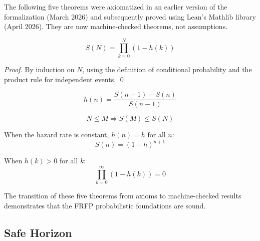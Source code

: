 The following five theorems were axiomatized in an earlier version of the
formalization (March 2026) and subsequently proved using Lean's Mathlib library
(April 2026). They are now machine-checked theorems, not assumptions.

\begin{theorem}
\[
  S(N) = \prod_{k=0}^{N} (1 - h(k))
\]
\end{theorem}
\begin{proof}
By induction on $N$, using the definition of conditional probability and the
product rule for independent events. \qed
\end{proof}

\begin{theorem}
\[
  h(n) = \frac{S(n-1) - S(n)}{S(n-1)}
\]
\end{theorem}

\begin{theorem}
\[
  N \leq M \Rightarrow S(M) \leq S(N)
\]
\end{theorem}

\begin{theorem}
When the hazard rate is constant, $h(n) = h$ for all $n$:
\[
  S(n) = (1-h)^{n+1}
\]
\end{theorem}

\begin{theorem}
When $h(k) > 0$ for all $k$:
\[
  \prod_{k=0}^{\infty} (1 - h(k)) = 0
\]
\end{theorem}

\begin{note}
The transition of these five theorems from axioms to machine-checked results
demonstrates that the FRFP probabilistic foundations are sound.
\end{note}

\subsection{Safe Horizon}

